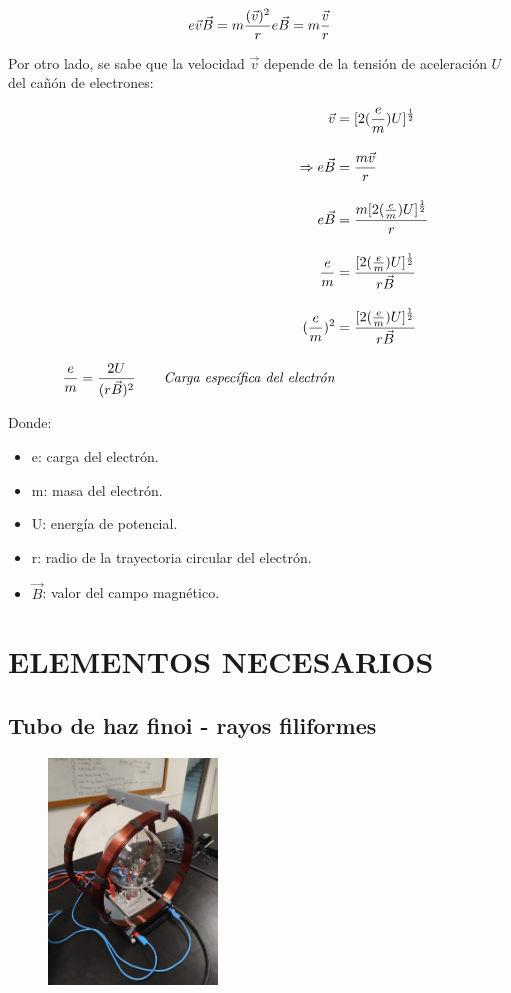 \documentclass[a4paper]{article}
\begin{document}
    \begin{equation}
        e \vec{v} \vec{B} = m {\frac {(\vec{v})^2}{r}} \\ 
        e \vec{B} = m \frac {\vec{v}}{r}
    \end{equation}

    \indent Por otro lado, se sabe que la velocidad $\vec{v}$ depende de la tensión de aceleración $U$ del cañón de electrones:

    \begin{align}
        \vec{v} &= [2 (\frac {e}{m}) U]^{\frac{1}{2}} \tag*{} \\[10pt]
        \Rightarrow e \vec{B} &= \frac{m {\vec{v}}}{r} \tag*{} \\[10pt]
        e \vec{B} &= \frac{m[2 (\frac {e}{m}) U]^{\frac{1}{2}}}{r} \tag*{} \\[10pt]
        \frac{e}{m} &= \frac{[2 (\frac {e}{m}) U]^{\frac{1}{2}}}{r \vec{B}} \tag*{} \\[10pt]
        (\frac{e}{m})^{2} &= \frac{[2 (\frac {e}{m}) U]^{\frac{1}{2}}}{r \vec{B}} \tag*{} \\[10pt]
        \frac{e}{m} = \frac{2 U}{(r \vec{B})^2} \tag*{\textit{Carga específica del electrón}}
    \end{align}

    \indent Donde:
    \begin{itemize}
        \item e: carga del electrón.
        \item m: masa del electrón.
        \item U: energía de potencial.
        \item r: radio de la trayectoria circular del electrón.
        \item $\vec{B}$: valor del campo magnético.
    \end{itemize}

\newpage
\noindent
\thispagestyle{fancy}

\section{ELEMENTOS NECESARIOS}

        \subsection{Tubo de haz finoi - rayos filiformes}

        \begin{figure}[h!]
            \centering
            \includegraphics[width = 4.5cm] {../imagenes/tubodehazfino.jpg}
        \end{figure}
\end{document}
